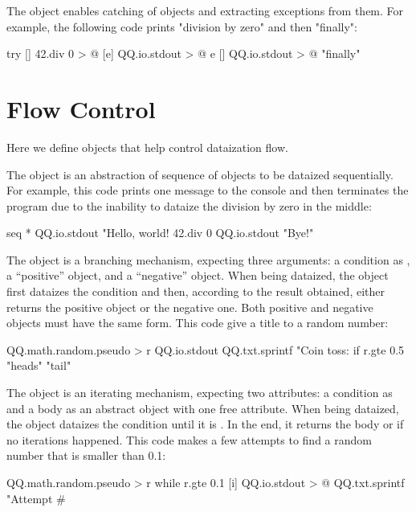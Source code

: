 \documentclass[sigplan,nonacm]{acmart}
\newcommand\aff[1]{\ff{\textcolor{gray}{\(\star\)}#1}}
\newcommand\adeff[1]{\aff{\textcolor{blue!50!black}{\textbf{#1}}}}
\begin{document}
The \adeff{try} object enables catching of \aff{error} objects and extracting
exceptions from them. For example, the following code prints "division by zero"
and then "finally":

\begin{ffcode}
try
  []
    42.div 0 > @
  [e]
    QQ.io.stdout > @
      e
  []
    QQ.io.stdout > @
      "finally"
\end{ffcode}

\section{Flow Control}\label{sec:flow}

Here we define objects that help control dataization flow.

The \adeff{seq} object is an abstraction of sequence of objects to be dataized
sequentially. For example, this code prints one message to the console and then
terminates the program due to the inability to dataize the division by zero in
the middle:

\begin{ffcode}
seq
  *
    QQ.io.stdout "Hello, world!
    42.div 0
    QQ.io.stdout "Bye!"
\end{ffcode}

The \adeff{if} object is a branching mechanism, expecting three arguments: a
condition as , a ``positive'' object, and a ``negative'' object. When
being dataized, the object \aff{if} first dataizes the condition and then,
according to the result obtained, either returns the positive object or the
negative one. Both positive and negative objects must have the same form. This
code give a title to a random number:

\begin{ffcode}
QQ.math.random.pseudo > r
QQ.io.stdout
  QQ.txt.sprintf
    "Coin toss: %
    if
      r.gte 0.5
      "heads"
      "tail"
\end{ffcode}

The \adeff{while} object is an iterating mechanism, expecting two attributes: a
condition as  and a body as an abstract object with one free
attribute. When being dataized, the object \aff{while} dataizes the condition
until it is . In the end, it returns the body or  if no
iterations happened. This code makes a few attempts to find a random number
that is smaller than 0.1:

\begin{ffcode}
QQ.math.random.pseudo > r
while
  r.gte 0.1
  [i]
    QQ.io.stdout > @
      QQ.txt.sprintf
        "Attempt #%
\end{ffcode}
\end{document}
